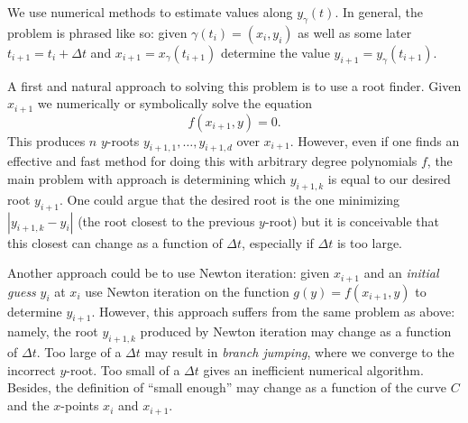 We use numerical methods to estimate values along $y_\gamma(t)$. In
general, the problem is phrased like so: given $\gamma(t_i) = (x_i,y_i)$
as well as some later $t_{i+1} = t_i + \Delta t$ and $x_{i+1} =
x_\gamma(t_{i+1})$ determine the value $y_{i+1} = y_\gamma(t_{i+1})$.

A first and natural approach to solving this problem is to use a root
finder. Given $x_{i+1}$ we numerically or symbolically solve the
equation
\[
    f(x_{i+1},y) = 0.
\]
This produces $n$ $y$-roots $y_{i+1,1}, \ldots, y_{i+1,d}$ over
$x_{i+1}$. However, even if one finds an effective and fast method for
doing this with arbitrary degree polynomials $f$, the main problem with
approach is determining which $y_{i+1,k}$ is equal to our desired root
$y_{i+1}$. One could argue that the desired root is the one minimizing
$|y_{i+1,k} - y_i|$ (the root closest to the previous $y$-root) but it
is conceivable that this closest can change as a function of $\Delta t$,
especially if $\Delta t$ is too large.

Another approach could be to use Newton iteration: given $x_{i+1}$ and
an {\it initial guess} $y_i$ at $x_i$ use Newton iteration on the
function $g(y) = f(x_{i+1}, y)$ to determine $y_{i+1}$. However, this
approach suffers from the same problem as above: namely, the root
$y_{i+1,k}$ produced by Newton iteration may change as a function of
$\Delta t$. Too large of a $\Delta t$ may result in {\it branch
  jumping}, where we converge to the incorrect $y$-root. Too small of a
$\Delta t$ gives an inefficient numerical algorithm. Besides, the
definition of ``small enough'' may change as a function of the curve $C$
and the $x$-points $x_{i}$ and $x_{i+1}$.

